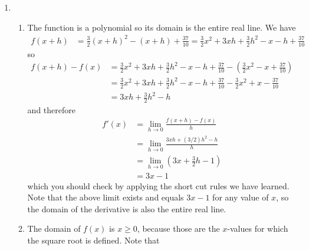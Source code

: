 \documentclass{article}
\begin{document}
\begin{enumerate}
\item %
  \begin{enumerate}
  \item %
    The function is a polynomial so its domain is the entire real
    line.  We have
    \begin{align*}
      f(x+h) &= \frac{3}{2} (x+h)^2 - (x+h) + \frac{37}{10}
      = \frac{3}{2} x^2 + 3xh + \frac{3}{2} h^2 - x - h + \frac{37}{10}
    \end{align*}
    so
    \begin{align*}
      f(x+h)-f(x) 
      &= \frac{3}{2} x^2 + 3xh + \frac{3}{2} h^2 - x - h + \frac{37}{10}
      - \left(\frac{3}{2} x^2 -x + \frac{37}{10}\right)
      \\
      &= \frac{3}{2} x^2 + 3xh + \frac{3}{2} h^2 - x - h + \frac{37}{10}
      - \frac{3}{2} x^2 + x - \frac{37}{10}
      \\
      &= 3xh + \frac{3}{2} h^2 - h 
    \end{align*}
    and therefore
    \begin{align*}
      f'(x) &= \lim_{h\to 0} \frac{f(x+h)-f(x)}{h}
      \\
      &= \lim_{h\to 0} \frac{3xh+(3/2)h^2-h}{h}
      \\
      &= \lim_{h\to 0} \left(3x+\frac{3}{2} h-1\right)
      \\
      &= 3x-1
    \end{align*}
    which you should check by applying the short cut rules we have learned.
    Note that the above limit exists and equals $3x-1$ for any value of
    $x$, so the domain of the derivative is also the entire real line.
  \item %
    The domain of $f(x)$ is $x\ge 0$, because those are the $x$-values
    for which the square root is defined.  Note that

\end{enumerate}
\end{enumerate}
\end{document}
